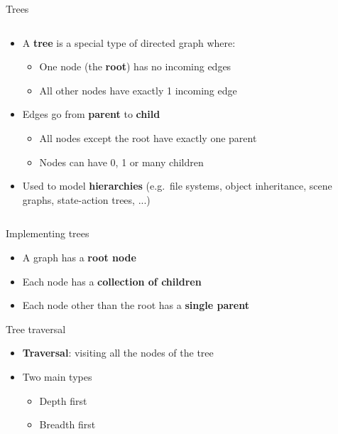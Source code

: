 \begin{frame}{Trees}
\begin{columns}
		\begin{column}{0.68\textwidth}
			\begin{itemize}
				\pause\item A \textbf{tree} is a special type of directed graph where:
					\begin{itemize}
						\pause\item One node (the \textbf{root}) has no incoming edges
						\pause\item All other nodes have exactly 1 incoming edge
					\end{itemize}
				\pause\item Edges go from \textbf{parent} to \textbf{child}
					\begin{itemize}
						\pause\item All nodes except the root have exactly one parent
						\pause\item Nodes can have 0, 1 or many children
					\end{itemize}
				\pause\item Used to model \textbf{hierarchies} (e.g.\ file systems, object inheritance, scene graphs, state-action trees, ...)
			\end{itemize}
		\end{column}
	\end{columns}
\end{frame}

\begin{frame}{Implementing trees}
	\begin{itemize}
		\pause\item A graph has a \textbf{root node}
		\pause\item Each node has a \textbf{collection of children}
		\pause\item Each node other than the root has a \textbf{single parent}
	\end{itemize}
\end{frame}

\begin{frame}{Tree traversal}
	\begin{itemize}
		\pause\item \textbf{Traversal}: visiting all the nodes of the tree
		\pause\item Two main types
			\begin{itemize}
				\pause\item Depth first
				\pause\item Breadth first
			\end{itemize}
	\end{itemize}
\end{frame}

